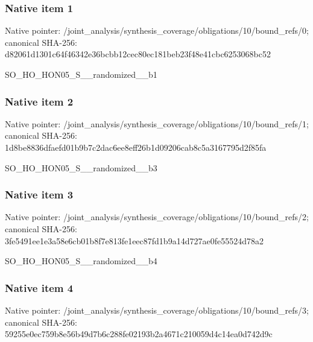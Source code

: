 \documentclass[10pt,a4paper]{article}
\begin{document}
\subsubsection{Native item 1}
Native pointer: /joint\_\allowbreak{}analysis/synthesis\_\allowbreak{}coverage/obligations/10/bound\_\allowbreak{}refs/0; canonical SHA-256: d82061d1301c64f46342e36bcbb12cec80ec181beb23f48e41cbc6253068bc52

\begingroup\raggedright\sloppy SO\_\allowbreak{}HO\_\allowbreak{}HON05\_\allowbreak{}S\_\allowbreak{}\_\allowbreak{}randomized\_\allowbreak{}\_\allowbreak{}b1\par\endgroup

\subsubsection{Native item 2}
Native pointer: /joint\_\allowbreak{}analysis/synthesis\_\allowbreak{}coverage/obligations/10/bound\_\allowbreak{}refs/1; canonical SHA-256: 1d8be8836dfaefd01b9b7c2dac6ee8eff26b1d09206cab8c5a3167795d2f85fa

\begingroup\raggedright\sloppy SO\_\allowbreak{}HO\_\allowbreak{}HON05\_\allowbreak{}S\_\allowbreak{}\_\allowbreak{}randomized\_\allowbreak{}\_\allowbreak{}b3\par\endgroup

\subsubsection{Native item 3}
Native pointer: /joint\_\allowbreak{}analysis/synthesis\_\allowbreak{}coverage/obligations/10/bound\_\allowbreak{}refs/2; canonical SHA-256: 3fe5491ee1e3a58e6cb01b8f7e813fe1eec87fd1b9a14d727ae0fe55524d78a2

\begingroup\raggedright\sloppy SO\_\allowbreak{}HO\_\allowbreak{}HON05\_\allowbreak{}S\_\allowbreak{}\_\allowbreak{}randomized\_\allowbreak{}\_\allowbreak{}b4\par\endgroup

\subsubsection{Native item 4}
Native pointer: /joint\_\allowbreak{}analysis/synthesis\_\allowbreak{}coverage/obligations/10/bound\_\allowbreak{}refs/3; canonical SHA-256: 59255e0ec759b8e56b49d7b6c288fe02193b2a4671c210059d4c14ea0d742d9c
\end{document}
